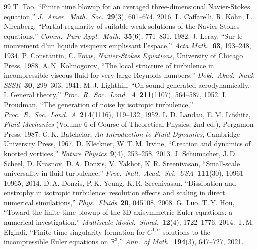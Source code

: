 \documentclass[11pt,a4paper]{article}
\begin{document}
\begin{thebibliography}{99}
  T. Tao,
  ``Finite time blowup for an averaged three-dimensional Navier-Stokes equation,''
  \emph{J.\ Amer.\ Math.\ Soc.}\ \textbf{29}(3), 601--674, 2016.
  L. Caffarelli, R. Kohn, L. Nirenberg,
  ``Partial regularity of suitable weak solutions of the Navier-Stokes equations,''
  \emph{Comm.\ Pure Appl.\ Math.}\ \textbf{35}(6), 771--831, 1982.
  J. Leray,
  ``Sur le mouvement d'un liquide visqueux emplissant l'espace,''
  \emph{Acta Math.}\ \textbf{63}, 193--248, 1934.
  P. Constantin, C. Foias,
  \emph{Navier-Stokes Equations}, University of Chicago Press, 1988.
  A.\,N. Kolmogorov,
  ``The local structure of turbulence in incompressible viscous fluid for very large Reynolds
  numbers,'' \emph{Dokl.\ Akad.\ Nauk SSSR}\ \textbf{30}, 299--303, 1941.
  M.\,J. Lighthill,
  ``On sound generated aerodynamically. I. General theory,''
  \emph{Proc.\ R.\ Soc.\ Lond.\ A}\ \textbf{211}(1107), 564--587, 1952.
  I. Proudman,
  ``The generation of noise by isotropic turbulence,''
  \emph{Proc.\ R.\ Soc.\ Lond.\ A}\ \textbf{214}(1116), 119--132, 1952.
  L.\,D. Landau, E.\,M. Lifshitz,
  \emph{Fluid Mechanics} (Volume 6 of Course of Theoretical Physics, 2nd ed.),
  Pergamon Press, 1987.
  G.\,K. Batchelor,
  \emph{An Introduction to Fluid Dynamics},
  Cambridge University Press, 1967.
  D. Kleckner, W.\,T.\,M. Irvine,
  ``Creation and dynamics of knotted vortices,''
  \emph{Nature Physics}\ \textbf{9}(4), 253--258, 2013.
  J. Schumacher, J.\,D. Scheel, D. Krasnov, D.\,A. Donzis, V. Yakhot, K.\,R. Sreenivasan,
  ``Small-scale universality in fluid turbulence,''
  \emph{Proc.\ Natl.\ Acad.\ Sci.\ USA}\ \textbf{111}(30), 10961--10965, 2014.
  D.\,A. Donzis, P.\,K. Yeung, K.\,R. Sreenivasan,
  ``Dissipation and enstrophy in isotropic turbulence: resolution effects and scaling in direct
  numerical simulations,'' \emph{Phys.\ Fluids}\ \textbf{20}, 045108, 2008.
  G. Luo, T.\,Y. Hou,
  ``Toward the finite-time blowup of the 3D axisymmetric Euler equations: a numerical investigation,''
  \emph{Multiscale Model.\ Simul.}\ \textbf{12}(4), 1722--1776, 2014.
  T.\,M. Elgindi,
  ``Finite-time singularity formation for $C^{1,\alpha}$ solutions to the incompressible Euler
  equations on $\mathbb{R}^3$,'' \emph{Ann.\ of Math.}\ \textbf{194}(3), 647--727, 2021.

\end{thebibliography}
\end{document}
